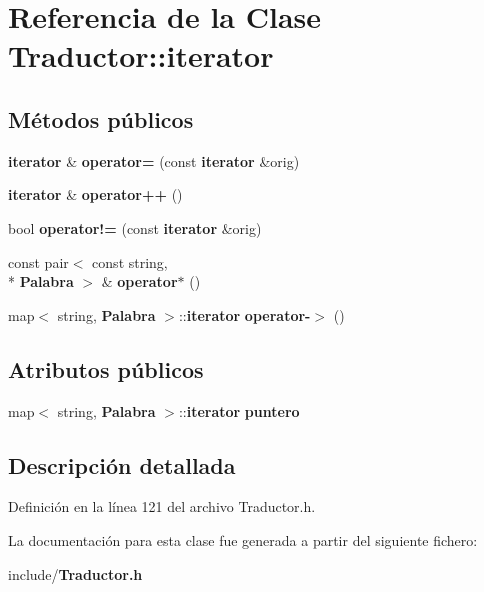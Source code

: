 \section{Referencia de la Clase Traductor\-:\-:iterator}
\label{classTraductor_1_1iterator}
\subsection*{Métodos públicos}
\begin{DoxyCompactItemize}
\item 
{\bf iterator} \& {\bfseries operator=} (const {\bf iterator} \&orig)\label{classTraductor_1_1iterator_a0235939b8d94ee9192a87c91f9e26574}

\item 
{\bf iterator} \& {\bfseries operator++} ()\label{classTraductor_1_1iterator_a580938c4aa23a1c201cc95d8587c87f4}

\item 
bool {\bfseries operator!=} (const {\bf iterator} \&orig)\label{classTraductor_1_1iterator_adb42a1373617d72f773d9fefa3a0ec9a}

\item 
const pair$<$ const string, \\*
{\bf Palabra} $>$ \& {\bfseries operator$\ast$} ()\label{classTraductor_1_1iterator_a4990911aa7cafad4822ab8c26e995710}

\item 
map$<$ string, {\bf Palabra} $>$\-::{\bf iterator} {\bfseries operator-\/$>$} ()\label{classTraductor_1_1iterator_a9b999945187cb876e4ba90e8e8d744ba}

\end{DoxyCompactItemize}
\subsection*{Atributos públicos}
\begin{DoxyCompactItemize}
\item 
map$<$ string, {\bf Palabra} $>$\-::{\bf iterator} {\bfseries puntero}\label{classTraductor_1_1iterator_a03d323d0d77a0d98096671a8936753a3}

\end{DoxyCompactItemize}


\subsection{Descripción detallada}


Definición en la línea 121 del archivo Traductor.\-h.



La documentación para esta clase fue generada a partir del siguiente fichero\-:\begin{DoxyCompactItemize}
\item 
include/{\bf Traductor.\-h}\end{DoxyCompactItemize}
